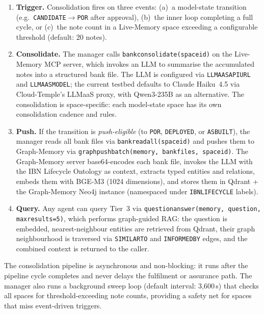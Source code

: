 \documentclass[acmtog]{acmart}
\renewcommand\_{\textunderscore\allowbreak}
\begin{document}
\begin{enumerate}
  \item \textbf{Trigger.} Consolidation fires on three events:
    (a)~a model-state transition
    (e.g.\ \texttt{CANDIDATE}$\rightarrow$\texttt{POR} after
    approval), (b)~the inner loop completing a full cycle, or
    (c)~the note count in a Live-Memory space exceeding a
    configurable threshold (default: 20 notes).

  \item \textbf{Consolidate.} The manager calls
    \texttt{bank\_consolidate(space\_id)} on the Live-Memory
    MCP server, which invokes an LLM to summarise the accumulated
    notes into a structured bank file. The LLM is configured via
    \texttt{LLMAAS\_API\_URL} and \texttt{LLMAAS\_MODEL}; the
    current testbed defaults to Claude Haiku~4.5 via Cloud-Temple's
    LLMaaS proxy, with Qwen3-235B as an alternative. The
    consolidation is space-specific: each model-state space has
    its own consolidation cadence and rules.

  \item \textbf{Push.} If the transition is \emph{push-eligible}
    (to \texttt{POR}, \texttt{DEPLOYED}, or \texttt{AS\_BUILT}),
    the manager reads all bank files via
    \texttt{bank\_read\_all(space\_id)} and pushes them to
    Graph-Memory via \texttt{graph\_push\_batch(memory,
    bank\_files, space\_id)}. The Graph-Memory server base64-encodes
    each bank file, invokes the LLM with the IBN Lifecycle Ontology
    as context, extracts typed entities and relations, embeds them
    with BGE-M3 (1024 dimensions), and stores them in Qdrant +
    the Graph-Memory Neo4j instance (namespaced under
    \texttt{IBN\_LIFECYCLE\_*} labels).

  \item \textbf{Query.} Any agent can query Tier~3 via
    \texttt{question\_answer(memory, question, max\_results=5)},
    which performs graph-guided RAG: the question is embedded,
    nearest-neighbour entities are retrieved from Qdrant, their
    graph neighbourhood is traversed via \texttt{SIMILAR\_TO} and
    \texttt{INFORMED\_BY} edges, and the combined context is
    returned to the caller.
\end{enumerate}

The consolidation pipeline is asynchronous and non-blocking: it
runs after the pipeline cycle completes and never delays the
fulfilment or assurance path. The manager also runs a background
sweep loop (default interval: 3,600\,s) that checks all spaces
for threshold-exceeding note counts, providing a safety net for
spaces that miss event-driven triggers.
\end{document}
